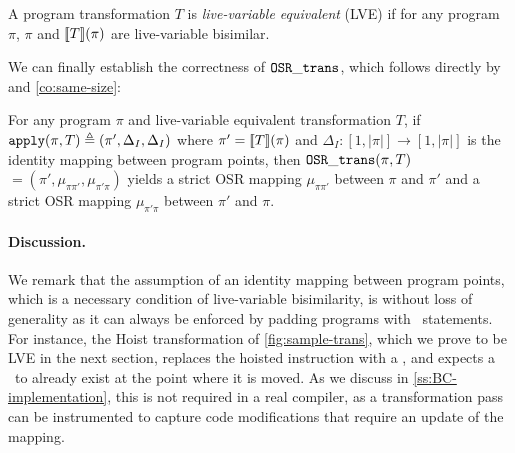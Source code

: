 \begin{definition}
\label{de:lve-trans}
A program transformation $T$ is {\em live-variable equivalent} (LVE) if for any program $\pi$, $\pi$ and $[\![T]\!](\pi)$ are live-variable bisimilar.
\end{definition}

\noindent We can finally establish the correctness of ${\tt OSR\_trans}$, which follows directly by  and \ref{co:same-size}:

\begin{theorem}
\label{th:osr-trans-correctness}
For any program $\pi$ and live-variable equivalent transformation $T$, if ${\tt apply}(\pi,T)\triangleq(\pi', \Delta_I, \Delta_I)$ where $\pi'=[\![T]\!](\pi)$ and $\Delta_I:[1,|\pi|]\rightarrow [1,|\pi|]$ is the identity mapping between program points, then ${\tt OSR\_trans}(\pi,T)$ $=(\pi',\mu_{\pi\pi'},\mu_{\pi'\pi})$ yields a strict OSR mapping $\mu_{\pi\pi'}$ between $\pi$ and $\pi'$ and a strict OSR mapping $\mu_{\pi'\pi}$ between $\pi'$ and $\pi$.
\end{theorem}

\paragraph*{Discussion.} We remark that the assumption of an identity mapping between program points, which is a necessary condition of live-variable bisimilarity, is without loss of generality as it can  always be enforced by padding programs with \wskip\ statements. For instance, the Hoist transformation of \myfigure\ref{fig:sample-trans}, which we prove to be LVE in the next section, replaces the hoisted instruction with a \wskip, and expects a \wskip\ to already exist at the point where it is moved. As we discuss in \mysection\ref{ss:BC-implementation}, this is not required in a real compiler, as a transformation pass can be instrumented to capture code modifications that require an update of the mapping.
